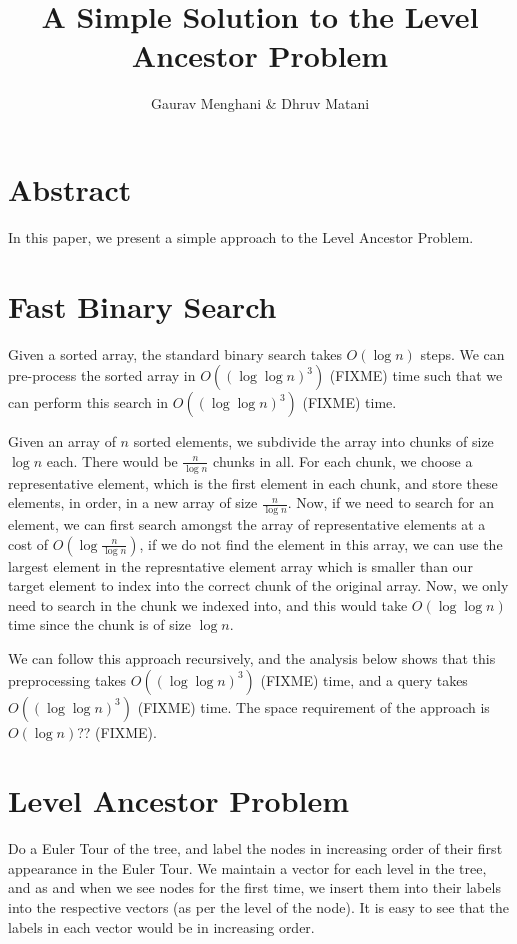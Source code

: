 \documentclass{article}
\title{A Simple Solution to the Level Ancestor Problem}
\author{Gaurav Menghani \& Dhruv Matani}
\begin{document}
\maketitle


\section{Abstract}
In this paper, we present a simple approach to the Level Ancestor Problem.

\section{Fast Binary Search}
Given a sorted array, the standard binary search takes $O(\log{n})$ steps. 
We can pre-process the sorted array in $O((\log{\log{n}})^3)$ (FIXME) time 
such that we can perform this search in $O((\log{\log{n}})^3)$ (FIXME) time.

Given an array of $n$ sorted elements, we subdivide the array into chunks of 
size $\log{n}$ each. There would be $ \frac{n}{ \log{n} }$ chunks in all. For each 
chunk, we choose a representative element, which is the first element in each 
chunk, and store these elements, in order, in a new array of size $\frac{n}{\log{n}}$. 
Now, if we need to search for an element, we can first search amongst the 
array of representative elements at a cost of $O(\log{\frac{n}{\log{n}}})$, 
if we do not find the element in this array, we can use the largest element 
in the represntative element array which is smaller than our target element to 
index into the correct chunk of the original array. Now, we only need to search 
in the chunk we indexed into, and this would take $O(\log{\log{n}})$ time since 
the chunk is of size $\log{n}$.

We can follow this approach recursively, and the analysis below shows that this
preprocessing takes $O((\log{\log{n}})^3)$ (FIXME) time, and a query takes
$O((\log{\log{n}})^3)$ (FIXME) time. The space requirement of the approach is 
$O(\log{n})$?? (FIXME).

\section{Level Ancestor Problem}
Do a Euler Tour of the tree, and label the nodes in increasing order of their
first appearance in the Euler Tour. We maintain a vector for each level in the 
tree, and as and when we see nodes for the first time, we insert them into their
labels into the respective vectors (as per the level of the node). It is easy
to see that the labels in each vector would be in increasing order.
\end{document}
